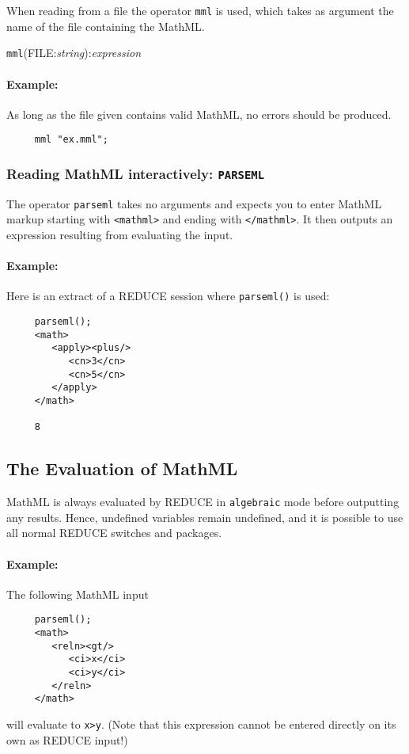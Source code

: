 When reading from a file the operator \texttt{mml} is used, which takes
as argument the name of the file containing the MathML.

\texttt{mml}(FILE:\textit{string}):\textit{expression}

\paragraph{Example:}
As long as the file given contains valid MathML, no errors should be
produced.
\begin{verbatim}
     mml "ex.mml";
\end{verbatim}

\subsubsection{Reading MathML interactively: \texttt{PARSEML}}

The operator \texttt{parseml} takes no arguments and expects you to
enter MathML markup starting with \verb|<mathml>| and ending with
\verb|</mathml>|.  It then outputs an expression resulting from
evaluating the input.

\paragraph{Example:}
Here is an extract of a REDUCE session where \texttt{parseml()} is
used:
\begin{verbatim}
     parseml();
     <math>
        <apply><plus/>
           <cn>3</cn>
           <cn>5</cn>
        </apply>
     </math>

     8
\end{verbatim}

\subsection{The Evaluation of MathML}

MathML is always evaluated by REDUCE in \texttt{algebraic} mode before
outputting any results.  Hence, undefined variables remain undefined,
and it is possible to use all normal REDUCE switches and packages.

\paragraph{Example:}
The following MathML input
\begin{verbatim}
     parseml();
     <math>
        <reln><gt/>
           <ci>x</ci>
           <ci>y</ci>
        </reln>
     </math>
\end{verbatim}
will evaluate to \verb|x>y|.  (Note that this expression cannot be
entered directly on its own as REDUCE input!)

